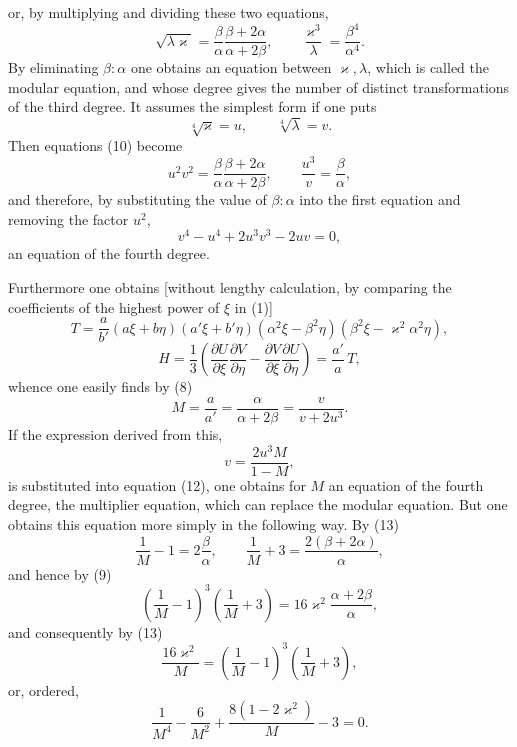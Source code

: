 \documentclass[11pt]{article}
\begin{document}
or, by multiplying and dividing these two equations,
\begin{equation}
\sqrt{\lambda\varkappa}=\frac{\beta}{\alpha}\frac{\beta+2\alpha}{\alpha+2\beta},
\qquad
\frac{\varkappa^3}{\lambda}=\frac{\beta^4}{\alpha^4}.
\tag{10}
\end{equation}
By eliminating $\beta:\alpha$ one obtains an equation between $\varkappa,\lambda$, which is called the modular equation, and whose degree gives the number of distinct transformations of the third degree. It assumes the simplest form if one puts
\begin{equation}
\sqrt[4]{\varkappa}=u,\qquad \sqrt[4]{\lambda}=v.
\tag{11}
\end{equation}
Then equations (10) become
\[
u^2v^2=\frac{\beta}{\alpha}\frac{\beta+2\alpha}{\alpha+2\beta},
\qquad
\frac{u^3}{v}=\frac{\beta}{\alpha},
\]
and therefore, by substituting the value of $\beta:\alpha$ into the first equation and removing the factor $u^2$,
\begin{equation}
v^4-u^4+2u^3v^3-2uv=0,
\tag{12}
\end{equation}
an equation of the fourth degree.

Furthermore one obtains [without lengthy calculation, by comparing the coefficients of the highest power of $\xi$ in (1)]
\[
T=\frac{a}{b'}(a\xi+b\eta)(a'\xi+b'\eta)(\alpha^2\xi-\beta^2\eta)(\beta^2\xi-\varkappa^2\alpha^2\eta),
\]
\[
H=\frac13\left(
\frac{\partial U}{\partial\xi}\frac{\partial V}{\partial\eta}
-\frac{\partial V}{\partial\xi}\frac{\partial U}{\partial\eta}
\right)=\frac{a'}a\,T,
\]
whence one easily finds by (8)
\begin{equation}
M=\frac{a}{a'}=\frac{\alpha}{\alpha+2\beta}
=\frac{v}{v+2u^3}.
\tag{13}
\end{equation}
If the expression derived from this,
\[
v=\frac{2u^3M}{1-M},
\]
is substituted into equation (12), one obtains for $M$ an equation of the fourth degree, the multiplier equation, which can replace the modular equation. But one obtains this equation more simply in the following way. By (13)
\[
\frac1M-1=2\frac{\beta}{\alpha},\qquad
\frac1M+3=\frac{2(\beta+2\alpha)}{\alpha},
\]
and hence by (9)
\[
\left(\frac1M-1\right)^3\left(\frac1M+3\right)
=16\varkappa^2\frac{\alpha+2\beta}{\alpha},
\]
and consequently by (13)
\[
\frac{16\varkappa^2}{M}
=\left(\frac1M-1\right)^3\left(\frac1M+3\right),
\]
or, ordered,
\begin{equation}
\frac1{M^4}-\frac6{M^2}+\frac{8(1-2\varkappa^2)}{M}-3=0.
\tag{14}
\end{equation}
\end{document}
